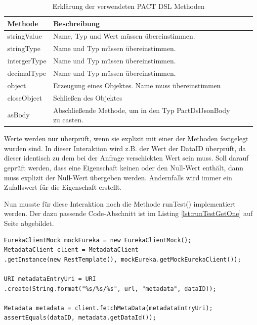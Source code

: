 \documentclass{llncs}
\begin{document}
\begin{table}[htbp]
\centering
\begin{tabular}{|l|l|p{4cm}|p{4cm}|}
\hline
\multicolumn{1}{|l|}{Methode} & Beschreibung \\ \hline
stringValue & Name, Typ und Wert müssen übereinstimmen. \\ \hline
stringType & Name und Typ müssen übereinstimmen. \\ \hline
intergerType & Name und Typ müssen übereinstimmen. \\ \hline
decimalType & Name und Typ müssen übereinstimmen. \\ \hline
object & Erzeugung eines Objektes. Name muss übereinstimmen  \\ \hline
closeObject & Schließen des Objektes\\ \hline
asBody & Abschließende Methode, um in den Typ PactDslJsonBody zu casten. \\ \hline
\end{tabular}
\caption{Erklärung der verwendeten PACT DSL Methoden}
\label{tab:Methoden_jsonBody}
\end{table}

Werte werden nur überprüft, wenn sie explizit mit einer der Methoden festgelegt wurden sind. In dieser Interaktion wird z.B. der Wert der DataID überprüft, da dieser identisch zu dem bei der Anfrage verschickten Wert sein muss. Soll darauf geprüft werden, dass eine Eigenschaft keinen oder den Null-Wert enthält, dann muss explizit der Null-Wert übergeben werden. Andernfalls wird immer ein Zufallswert für die Eigenschaft erstellt.

Nun musste für diese Interaktion noch die Methode runTest() implementiert werden. Der dazu passende Code-Abschnitt ist im Listing \ref{lst:runTestGetOne} auf Seite \pageref{lst:runTestGetOne} abgebildet.

\lstset{language = Java}
\begin{lstlisting}[caption=runTest() für die GET-Methode,label={lst:runTestGetOne}]
EurekaClientMock mockEureka = new EurekaClientMock();
MetadataClient client = MetadataClient
.getInstance(new RestTemplate(), mockEureka.getMockEurekaClient());

URI metadataEntryUri = URI
.create(String.format("%s/%s/%s", url, "metadata", dataID));

Metadata metadata = client.fetchMetaData(metadataEntryUri);
assertEquals(dataID, metadata.getDataId());
\end{lstlisting}
 
\end{document}
